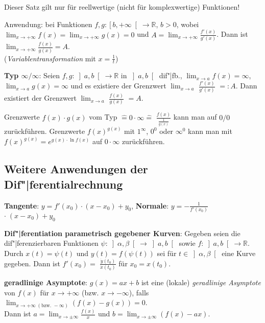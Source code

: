 Dieser Satz gilt nur für reellwertige (nicht für komplexwertige) Funktionen!

Anwendung: bei Funktionen
$f, g: \left[b,+\infty\right[ \rightarrow \mathbb{R}$, $b > 0$,
wobei \\
$\lim_{x \to +\infty} f(x) = \lim_{x \to +\infty} g(x) = 0$ und
$A = \lim_{x \to +\infty} \frac{f'(x)}{g'(x)}$.
Dann ist $\lim_{x \to +\infty} \frac{f(x)}{g(x)} = A$. \\
(\emph{Variablentransformation} mit $x = \frac{1}{t}$)

\linie

\textbf{Typ $\infty/\infty$}:
Seien $f, g: \left]a,b\right[ \rightarrow \mathbb{R}$ in $\left]a,b\right[$
dif"|fb., $\lim_{x \to a} f(x) = \infty$, $\lim_{x \to a} g(x) = \infty$
und es existiere der Grenzwert $\lim_{x \to a}$%
{\large $\frac{f'(x)}{g'(x)}$} $=: A$. \qquad
Dann existiert der Grenzwert $\lim_{x \to a}$%
{\large $\frac{f(x)}{g(x)}$} $= A$.

Grenzwerte $f(x) \cdot g(x)$ vom Typ $\mathrel{\widehat{=}} 0 \cdot \infty
\mathrel{\widehat{=}}$ {\large $\frac{f(x)}{\frac{1}{g(x)}}$} kann man auf
$0/0$ zurückführen.
Grenzwerte $f(x)^{g(x)}$ mit $1^\infty$, $0^0$ oder $\infty^0$ kann man
mit $f(x)^{g(x)} = e^{g(x) \cdot \ln f(x)}$ auf $0 \cdot \infty$ zurückführen.

\subsection{%
    Weitere Anwendungen der Dif"|ferentialrechnung%
}

\textbf{Tangente}: $y = f'(x_0) \cdot (x - x_0) + y_0$, \qquad
\textbf{Normale}: $y = -${\large $\frac{1}{f'(x_0)}$} $\cdot\; (x - x_0) + y_0$

\textbf{Dif"|ferentiation parametrisch gegebener Kurven}:
Gegeben seien die dif"|ferenzierbaren Funktionen
$\psi: \left]\alpha,\beta\right[ \rightarrow \left]a,b\right[$ sowie
$f: \left]a,b\right[ \rightarrow \mathbb{R}$.
Durch $x(t) = \psi(t)$ und $y(t) = f(\psi(t))$ sei für
$t \in \left]\alpha, \beta\right[$ eine Kurve gegeben.
Dann ist $f'(x_0) =$ {\large $\frac{\dot{y}(t_0)}{\dot{x}(t_0)}$}
für $x_0 = x(t_0)$.

\textbf{geradlinige Asymptote}:
$g(x) = ax + b$ ist eine (lokale) \emph{geradlinige Asymptote} von $f(x)$ für
$x \to +\infty$ (bzw. $x \to -\infty$), falls
$\lim_{x \to +\infty\; (\text{bzw. }-\infty)} (f(x) - g(x)) = 0$. \\
Dann ist $a = \lim_{x \to \pm\infty} \frac{f(x)}{x}$ und
$b = \lim_{x \to \pm\infty} (f(x) - ax)$.

